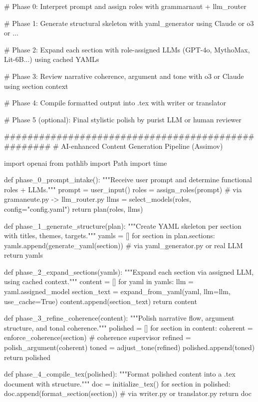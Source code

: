 \documentclass[12pt,a4paper]{article}
\begin{document}
			
			
\newpage
			
			\begin{metaoutput}
# Phase 0: Interpret prompt and assign roles with grammarnaut + llm_router

# Phase 1: Generate structural skeleton with yaml_generator using Claude or o3 or ...

# Phase 2: Expand each section with role-assigned LLMs (GPT-4o, MythoMax, Lit-6B...) using cached YAMLs

# Phase 3: Review narrative coherence, argument and tone with o3 or Claude using section context

# Phase 4: Compile formatted output into .tex with writer or translator

# Phase 5 (optional): Final stylistic polish by purist LLM or human reviewer

###################################################
# AI-enhanced Content Generation Pipeline (Assimov)

import openai
from pathlib import Path
import time

def phase_0_prompt_intake():
    """Receive user prompt and determine functional roles + LLMs."""
    prompt = user_input()
    roles = assign_roles(prompt)  # via gramaneute.py -> llm_router.py
    llms = select_models(roles, config="config.yaml")
    return plan(roles, llms)

def phase_1_generate_structure(plan):
    """Create YAML skeleton per section with titles, themes, targets."""
    yamls = []
    for section in plan.sections:
    yamls.append(generate_yaml(section))  # via yaml_generator.py or real LLM
    return yamls

def phase_2_expand_sections(yamls):
    """Expand each section via assigned LLM, using cached context."""
    content = []
    for yaml in yamls:
        llm = yaml.assigned_model
        section_text = expand_from_yaml(yaml, llm=llm, use_cache=True)
        content.append(section_text)
    return content

def phase_3_refine_coherence(content):
    """Polish narrative flow, argument structure, and tonal coherence."""
    polished = []
    for section in content:
        coherent = enforce_coherence(section)  # coherence supervisor
        refined = polish_argument(coherent)
        toned = adjust_tone(refined)
        polished.append(toned)
    return polished

def phase_4_compile_tex(polished):
    """Format polished content into a .tex document with structure."""
    doc = initialize_tex()
    for section in polished:
        doc.append(format_section(section))  # via writer.py or translator.py
    return doc


\end{metaoutput}
\end{document}
